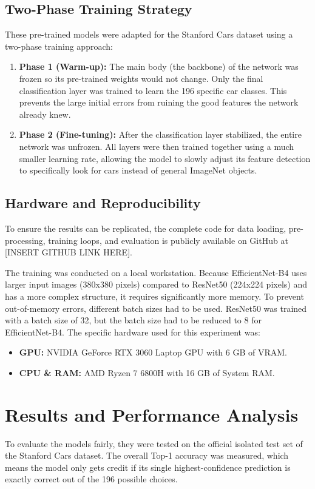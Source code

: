 \documentclass[conference]{IEEEtran}
\begin{document}
\subsection{Two-Phase Training Strategy}
These pre-trained models were adapted for the Stanford Cars dataset using a two-phase training approach:
\begin{enumerate}
    \item \textbf{Phase 1 (Warm-up):} The main body (the backbone) of the network was frozen so its pre-trained weights would not change. Only the final classification layer was trained to learn the 196 specific car classes. This prevents the large initial errors from ruining the good features the network already knew.
    \item \textbf{Phase 2 (Fine-tuning):} After the classification layer stabilized, the entire network was unfrozen. All layers were then trained together using a much smaller learning rate, allowing the model to slowly adjust its feature detection to specifically look for cars instead of general ImageNet objects.
\end{enumerate}

\subsection{Hardware and Reproducibility}
To ensure the results can be replicated, the complete code for data loading, pre-processing, training loops, and evaluation is publicly available on GitHub at [INSERT GITHUB LINK HERE]. 

The training was conducted on a local workstation. Because EfficientNet-B4 uses larger input images (380x380 pixels) compared to ResNet50 (224x224 pixels) and has a more complex structure, it requires significantly more memory. To prevent out-of-memory errors, different batch sizes had to be used. ResNet50 was trained with a batch size of 32, but the batch size had to be reduced to 8 for EfficientNet-B4. The specific hardware used for this experiment was:
\begin{itemize}
    \item \textbf{GPU:} NVIDIA GeForce RTX 3060 Laptop GPU with 6 GB of VRAM.
    \item \textbf{CPU \& RAM:} AMD Ryzen 7 6800H with 16 GB of System RAM.
\end{itemize}
\section{Results and Performance Analysis}
To evaluate the models fairly, they were tested on the official isolated test set of the Stanford Cars dataset. The overall Top-1 accuracy was measured, which means the model only gets credit if its single highest-confidence prediction is exactly correct out of the 196 possible choices.
\end{document}
